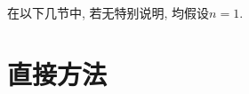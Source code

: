 \documentclass[12pt,a4paper]{article}
\begin{document}
在以下几节中, 若无特别说明, 均假设$n = 1$.









\section{直接方法}









\end{document}
